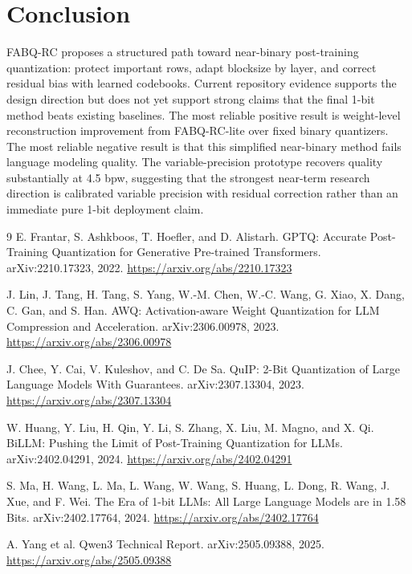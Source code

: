 \documentclass[11pt]{article}
\begin{document}
\section{Conclusion}

FABQ-RC proposes a structured path toward near-binary post-training quantization: protect important rows, adapt blocksize by layer, and correct residual bias with learned codebooks. Current repository evidence supports the design direction but does not yet support strong claims that the final 1-bit method beats existing baselines. The most reliable positive result is weight-level reconstruction improvement from FABQ-RC-lite over fixed binary quantizers. The most reliable negative result is that this simplified near-binary method fails language modeling quality. The variable-precision prototype recovers quality substantially at 4.5 bpw, suggesting that the strongest near-term research direction is calibrated variable precision with residual correction rather than an immediate pure 1-bit deployment claim.

\begin{thebibliography}{9}
E. Frantar, S. Ashkboos, T. Hoefler, and D. Alistarh.
\newblock GPTQ: Accurate Post-Training Quantization for Generative Pre-trained Transformers.
\newblock arXiv:2210.17323, 2022.
\newblock \url{https://arxiv.org/abs/2210.17323}

J. Lin, J. Tang, H. Tang, S. Yang, W.-M. Chen, W.-C. Wang, G. Xiao, X. Dang, C. Gan, and S. Han.
\newblock AWQ: Activation-aware Weight Quantization for LLM Compression and Acceleration.
\newblock arXiv:2306.00978, 2023.
\newblock \url{https://arxiv.org/abs/2306.00978}

J. Chee, Y. Cai, V. Kuleshov, and C. De Sa.
\newblock QuIP: 2-Bit Quantization of Large Language Models With Guarantees.
\newblock arXiv:2307.13304, 2023.
\newblock \url{https://arxiv.org/abs/2307.13304}

W. Huang, Y. Liu, H. Qin, Y. Li, S. Zhang, X. Liu, M. Magno, and X. Qi.
\newblock BiLLM: Pushing the Limit of Post-Training Quantization for LLMs.
\newblock arXiv:2402.04291, 2024.
\newblock \url{https://arxiv.org/abs/2402.04291}

S. Ma, H. Wang, L. Ma, L. Wang, W. Wang, S. Huang, L. Dong, R. Wang, J. Xue, and F. Wei.
\newblock The Era of 1-bit LLMs: All Large Language Models are in 1.58 Bits.
\newblock arXiv:2402.17764, 2024.
\newblock \url{https://arxiv.org/abs/2402.17764}

A. Yang et al.
\newblock Qwen3 Technical Report.
\newblock arXiv:2505.09388, 2025.
\newblock \url{https://arxiv.org/abs/2505.09388}
\end{thebibliography}
\end{document}
